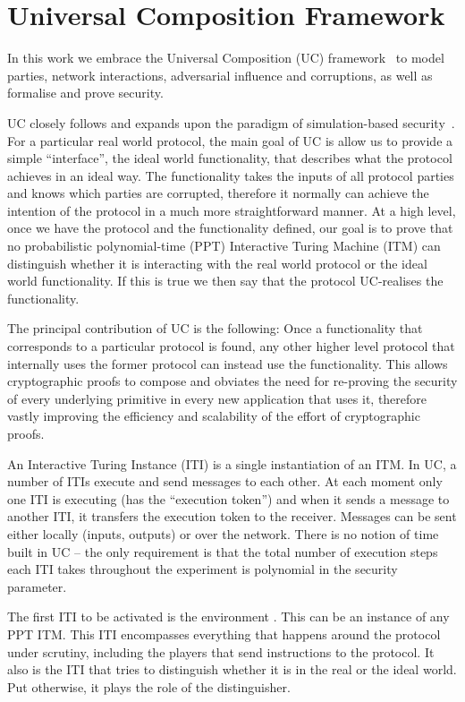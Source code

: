 \section{Universal Composition Framework}
\label{sec:uc}
  In this work we embrace the Universal Composition (UC) framework~\cite{uc} to
  model parties, network interactions, adversarial influence and corruptions, as
  well as formalise and prove security.

  UC closely follows and expands upon the paradigm of simulation-based
  security~\cite{DBLP:books/sp/17/Lindell17}. For a particular real world
  protocol, the main goal of UC is allow us to provide a simple ``interface'',
  the ideal world functionality, that describes what the protocol achieves in an
  ideal way. The functionality takes the inputs of all protocol parties and
  knows which parties are corrupted, therefore it normally can achieve the
  intention of the protocol in a much more straightforward manner. At a high
  level, once we have the protocol and the functionality defined, our goal is to
  prove that no probabilistic polynomial-time (PPT) Interactive Turing Machine
  (ITM) can distinguish whether it is interacting with the real world protocol
  or the ideal world functionality. If this is true we then say that the
  protocol UC-realises the functionality.

  The principal contribution of UC is the following: Once a functionality that
  corresponds to a particular protocol is found, any other higher level protocol
  that internally uses the former protocol can instead use the functionality.
  This allows cryptographic proofs to compose and obviates the need for
  re-proving the security of every underlying primitive in every new application
  that uses it, therefore vastly improving the efficiency and scalability of the
  effort of cryptographic proofs.

  An Interactive Turing Instance (ITI) is a single instantiation of an ITM. In
  UC, a number of ITIs execute and send
  messages to each other. At each moment only one ITI is executing (has the
  ``execution token'') and when it sends a message to another ITI, it transfers
  the execution token to the receiver. Messages can be sent either locally
  (inputs, outputs) or over the network. There is no notion of time built in UC
  -- the only requirement is that the total number of execution steps each ITI
  takes throughout the experiment is polynomial in the security parameter.

  The first ITI to be activated is the environment \environment. This can be an
  instance of any
  PPT ITM. This ITI encompasses everything that happens around the protocol
  under scrutiny, including the players that send instructions to the protocol.
  It also is the ITI that tries to distinguish whether it is in the real or the
  ideal world. Put otherwise, it plays the role of the distinguisher.

